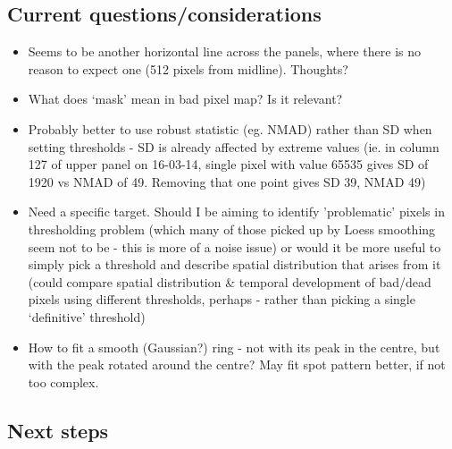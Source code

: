 \documentclass[10pt,fleqn]{article}
\begin{document}
\subsection*{Current questions/considerations}
\begin{itemize}

\item Seems to be another horizontal line across the panels, where there is no reason to expect one (512 pixels from midline). Thoughts?

\item What does `mask' mean in bad pixel map? Is it relevant?

\item Probably better to use robust statistic (eg. NMAD) rather than SD when setting thresholds - SD is already affected by extreme values (ie. in column 127 of upper panel on 16-03-14, single pixel with value 65535 gives SD of 1920 vs NMAD of 49. Removing that one point gives SD 39, NMAD 49)

\item Need a specific target. Should I be aiming to identify 'problematic' pixels in thresholding problem (which many of those picked up by Loess smoothing seem not to be - this is more of a noise issue) or would it be more useful to simply pick a threshold and describe spatial distribution that arises from it (could compare spatial distribution \& temporal development of bad/dead pixels using different thresholds, perhaps - rather than picking a single `definitive' threshold) 

\item How to fit a smooth (Gaussian?) ring - not with its peak in the centre, but with the peak rotated around the centre? May fit spot pattern better, if not too complex.

\end{itemize}




\subsection*{Next steps}
\end{document}
